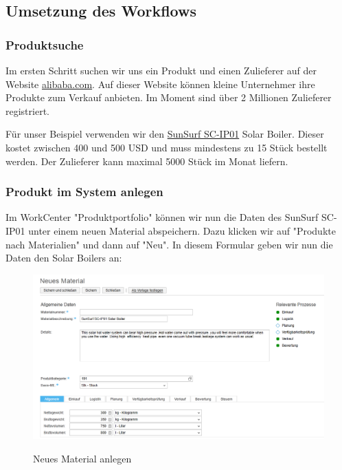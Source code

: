 \subsection{Umsetzung des Workflows}
\label{sec:byd-bsp-umsetzung}

\subsubsection{Produktsuche}

Im ersten Schritt suchen wir uns ein Produkt und einen Zulieferer auf der Website \url{alibaba.com}. Auf dieser Website können kleine Unternehmer ihre Produkte zum Verkauf anbieten. Im Moment sind über 2 Millionen Zulieferer registriert.

Für unser Beispiel verwenden wir den \href{http://www.alibaba.com/product-detail/SunSurf-SC-IP01-solar-boiler-system_627442099.html?s=p}{SunSurf SC-IP01} Solar Boiler. Dieser kostet zwischen 400 und 500 USD und muss mindestens zu 15 Stück bestellt werden. Der Zulieferer kann maximal 5000 Stück im Monat liefern.

\subsubsection{Produkt im System anlegen}

Im WorkCenter "Produktportfolio" können wir nun die Daten des SunSurf SC-IP01 unter einem neuen Material abspeichern. Dazu klicken wir auf "Produkte nach Materialien" und dann auf "Neu". In diesem Formular geben wir nun die Daten den Solar Boilers an:

\begin{figure}[H]
	\begin{center}
	\includegraphics[width=1.0\textwidth]{grafiken/ByDesign-HowTo-1.png}
	\caption{Neues Material anlegen}
	\vspace{-10pt}
	\label{abb:byd-newmaterial}
	\end{center}
\end{figure}

